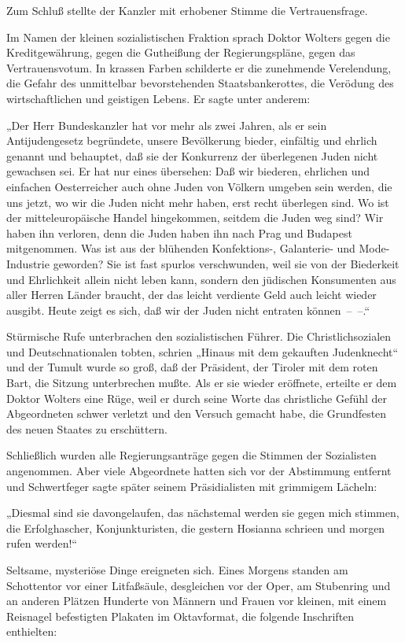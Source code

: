 Zum Schluß stellte der Kanzler mit erhobener Stimme die
Vertrauensfrage.

Im Namen der kleinen sozialistischen Fraktion sprach Doktor Wolters
gegen die Kreditgewährung, gegen die Gutheißung der
Regierungspläne, gegen das Vertrauensvotum. In krassen Farben
schilderte er die zunehmende Verelendung, die Gefahr des
unmittelbar bevorstehenden Staatsbankerottes, die Verödung des
wirtschaftlichen und geistigen Lebens. Er sagte unter anderem:

„Der Herr Bundeskanzler hat vor mehr als zwei Jahren, als er sein
Antijudengesetz begründete, unsere Bevölkerung bieder, einfältig
und ehrlich genannt und behauptet, daß sie der Konkurrenz der
überlegenen Juden nicht gewachsen sei. Er hat nur eines übersehen:
Daß wir biederen, ehrlichen und einfachen Oesterreicher auch ohne
Juden von Völkern umgeben sein werden, die uns jetzt, wo wir die
Juden nicht mehr haben, erst recht überlegen sind. Wo ist der
mitteleuropäische Handel hingekommen, seitdem die Juden weg sind?
Wir haben ihn verloren, denn die Juden haben ihn nach Prag und
Budapest mitgenommen.  Was ist aus der blühenden
Konfektions-, Galanterie- und Mode-Industrie geworden? Sie ist fast
spurlos verschwunden, weil sie von der Biederkeit und Ehrlichkeit
allein nicht leben kann, sondern den jüdischen Konsumenten aus
aller Herren Länder braucht, der das leicht verdiente Geld auch
leicht wieder ausgibt. Heute zeigt es sich, daß wir der Juden nicht
entraten können~–~–.“

Stürmische Rufe unterbrachen den sozialistischen Führer. Die
Christlichsozialen und Deutschnationalen tobten, schrien „Hinaus
mit dem gekauften Judenknecht“ und der Tumult wurde so groß, daß
der Präsident, der Tiroler mit dem roten Bart, die Sitzung
unterbrechen mußte. Als er sie wieder eröffnete, erteilte er dem
Doktor Wolters eine Rüge, weil er durch seine Worte das christliche
Gefühl der Abgeordneten schwer verletzt und den Versuch gemacht
habe, die Grundfesten des neuen Staates zu erschüttern.

Schließlich wurden alle Regierungsanträge gegen die Stimmen der
Sozialisten angenommen. Aber viele Abgeordnete hatten sich vor der
Abstimmung entfernt und Schwertfeger sagte später seinem
Präsidialisten mit grimmigem Lächeln:

„Diesmal sind sie davongelaufen, das nächstemal werden sie gegen
mich stimmen, die Erfolghascher, Konjunkturisten, die gestern
Hosianna schrieen und morgen  rufen werden!“

\tb{* * *}
Seltsame, mysteriöse Dinge ereigneten sich. Eines
Morgens standen am Schottentor vor einer Litfaßsäule, desgleichen
vor der Oper, am Stubenring und an anderen Plätzen Hunderte von
Männern und Frauen vor kleinen, mit einem Reisnagel befestigten
Plakaten im Oktavformat, die folgende Inschriften enthielten:

